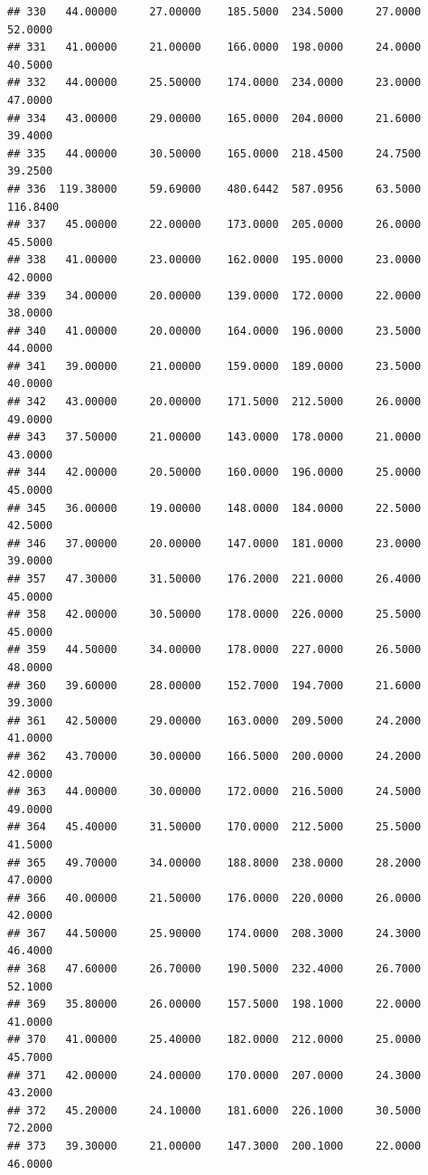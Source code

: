 \documentclass[]{article}
\begin{document}
\begin{verbatim}
## 330   44.00000     27.00000    185.5000  234.5000     27.0000       52.0000
## 331   41.00000     21.00000    166.0000  198.0000     24.0000       40.5000
## 332   44.00000     25.50000    174.0000  234.0000     23.0000       47.0000
## 334   43.00000     29.00000    165.0000  204.0000     21.6000       39.4000
## 335   44.00000     30.50000    165.0000  218.4500     24.7500       39.2500
## 336  119.38000     59.69000    480.6442  587.0956     63.5000      116.8400
## 337   45.00000     22.00000    173.0000  205.0000     26.0000       45.5000
## 338   41.00000     23.00000    162.0000  195.0000     23.0000       42.0000
## 339   34.00000     20.00000    139.0000  172.0000     22.0000       38.0000
## 340   41.00000     20.00000    164.0000  196.0000     23.5000       44.0000
## 341   39.00000     21.00000    159.0000  189.0000     23.5000       40.0000
## 342   43.00000     20.00000    171.5000  212.5000     26.0000       49.0000
## 343   37.50000     21.00000    143.0000  178.0000     21.0000       43.0000
## 344   42.00000     20.50000    160.0000  196.0000     25.0000       45.0000
## 345   36.00000     19.00000    148.0000  184.0000     22.5000       42.5000
## 346   37.00000     20.00000    147.0000  181.0000     23.0000       39.0000
## 357   47.30000     31.50000    176.2000  221.0000     26.4000       45.0000
## 358   42.00000     30.50000    178.0000  226.0000     25.5000       45.0000
## 359   44.50000     34.00000    178.0000  227.0000     26.5000       48.0000
## 360   39.60000     28.00000    152.7000  194.7000     21.6000       39.3000
## 361   42.50000     29.00000    163.0000  209.5000     24.2000       41.0000
## 362   43.70000     30.00000    166.5000  200.0000     24.2000       42.0000
## 363   44.00000     30.00000    172.0000  216.5000     24.5000       49.0000
## 364   45.40000     31.50000    170.0000  212.5000     25.5000       41.5000
## 365   49.70000     34.00000    188.8000  238.0000     28.2000       47.0000
## 366   40.00000     21.50000    176.0000  220.0000     26.0000       42.0000
## 367   44.50000     25.90000    174.0000  208.3000     24.3000       46.4000
## 368   47.60000     26.70000    190.5000  232.4000     26.7000       52.1000
## 369   35.80000     26.00000    157.5000  198.1000     22.0000       41.0000
## 370   41.00000     25.40000    182.0000  212.0000     25.0000       45.7000
## 371   42.00000     24.00000    170.0000  207.0000     24.3000       43.2000
## 372   45.20000     24.10000    181.6000  226.1000     30.5000       72.2000
## 373   39.30000     21.00000    147.3000  200.1000     22.0000       46.0000

\end{verbatim}
\end{document}

